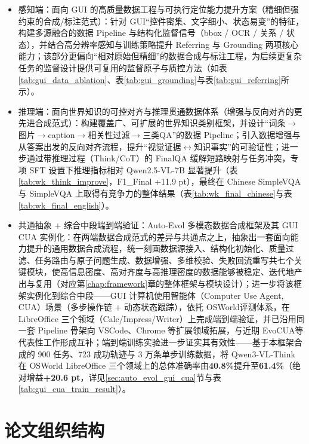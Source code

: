 \begin{itemize}
  \item 感知端：面向 GUI 的高质量数据工程与可执行定位能力提升方案（精细但强约束的合成/标注范式）：针对 GUI“控件密集、文字细小、状态易变”的特征，构建多源融合的数据 Pipeline 与结构化监督信号（bbox / OCR / 关系 / 状态），并结合高分辨率感知与训练策略提升 Referring 与 Grounding 两项核心能力；该部分更偏向“相对原始但精细”的数据合成与标注工程，为后续更复杂任务的监督设计提供可复用的监督原子与质控方法（如表\ref{tab:gui_data_ablation}、表\ref{tab:gui_grounding}与表\ref{tab:gui_referring}所示）。
  \item 推理端：面向世界知识的可控对齐与推理贯通数据体系（增强与反向对齐的更先进合成范式）：构建覆盖广、可扩展的世界知识类别框架，并设计“词条$\rightarrow$图片$\rightarrow$caption$\rightarrow$相关性过滤$\rightarrow$三类QA”的数据 Pipeline；引入数据增强与从答案出发的反向对齐流程，提升“视觉证据$\leftrightarrow$知识事实”的可验证性；进一步通过带推理过程（Think/CoT）的 FinalQA 缓解短路映射与任务冲突，专项 SFT 设置下推理指标相对 Qwen2.5-VL-7B 显著提升（表\ref{tab:wk_think_improve}，F1\_Final +11.9 pt），最终在 Chinese SimpleVQA 与 SimpleVQA 上取得有竞争力的整体结果（表\ref{tab:wk_final_chinese}与表\ref{tab:wk_final_english}）。
  \item 共通抽象 + 综合中段端到端验证：Auto-Evol 多模态数据合成框架及其 GUI CUA 实例化：在两端数据合成范式的差异与共通点之上，抽象出一套面向能力提升的通用数据合成流程，统一刻画数据源接入、结构化初始化、质量过滤、任务路由与原子问题生成、数据增强、多维校验、失败回流重写共七个关键模块，使高信息密度、高对齐度与高推理密度的数据能够被稳定、迭代地产出与复用（对应第\ref{chap:framework}章的整体框架与模块设计）；进一步将该框架实例化到综合中段——GUI 计算机使用智能体（Computer Use Agent, CUA）场景（多步操作链 + 动态状态跟踪），依托 OSWorld\citep{xie2024osworld}评测体系，在 LibreOffice 三个领域（Calc/\allowbreak Impress/\allowbreak Writer）上完成端到端验证，并已沿用同一套 Pipeline 骨架向 VSCode、Chrome 等扩展领域拓展，与近期 EvoCUA\citep{xue2026evocua}等代表性工作形成互补；端到端训练实验进一步证实其有效性——基于本框架合成的 900 任务、723 成功轨迹与 3 万条单步训练数据，将 Qwen3-VL-Think 在 OSWorld LibreOffice 三个领域上的总体准确率由\textbf{40.8\%}提升至\textbf{61.4\%}（绝对增益\textbf{+20.6 pt}，详见\ref{sec:auto_evol_gui_cua}节与表\ref{tab:gui_cua_train_result}）。
\end{itemize}

\section{论文组织结构}

